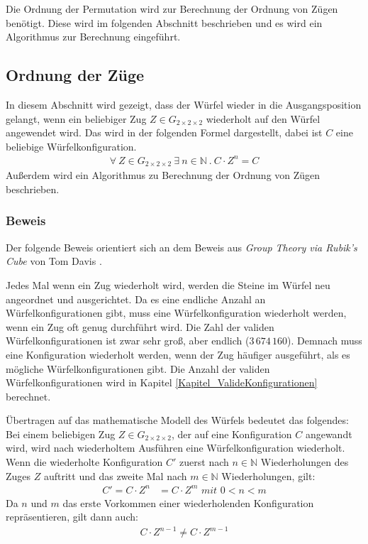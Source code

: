 \documentclass[12pt,a4paper, usenames, dvipsnames]{article}
\theoremstyle{mystyle}
\theoremstyle{definition}
\newcommand{\Gtwo}{\ensuremath{G_{2\times 2\times 2}}}
\begin{document}
Die Ordnung der Permutation wird zur Berechnung der Ordnung von Zügen benötigt. Diese wird im folgenden Abschnitt beschrieben und es wird ein Algorithmus zur Berechnung eingeführt.

%
%
%
%
%
%
%
%
%
%
%
%

\subsection{Ordnung der Züge}
\label{Abschnitt_OrdnungZüge}

In diesem Abschnitt wird gezeigt, dass der Würfel wieder in die Ausgangsposition gelangt, wenn ein beliebiger Zug $Z \in \Gtwo$ wiederholt auf den Würfel angewendet wird. Das wird in der folgenden Formel dargestellt, dabei ist $C$ eine beliebige Würfelkonfiguration.
\begin{align*}
\forall \ Z \in \Gtwo \ \exists \ n \in \mathbb{N} \ . \ C \cdot Z^n = C
\end{align*}
Außerdem wird ein Algorithmus zu Berechnung der Ordnung von Zügen beschrieben.

\subsubsection*{Beweis}

Der folgende Beweis orientiert sich an dem Beweis aus \textit{Group Theory via Rubik's Cube} von Tom Davis \cite{TD}.

Jedes Mal wenn ein Zug wiederholt wird, werden die Steine im Würfel neu angeordnet und ausgerichtet. 
Da es eine endliche Anzahl an Würfelkonfigurationen gibt, muss eine Würfelkonfiguration wiederholt werden, wenn ein Zug oft genug durchführt wird.
Die Zahl der validen Würfelkonfigurationen ist zwar sehr groß, aber endlich ($3 \, 674 \, 160$). Demnach muss eine Konfiguration wiederholt werden, wenn der Zug häufiger ausgeführt, als es mögliche Würfelkonfigurationen gibt. Die Anzahl der validen Würfelkonfigurationen wird in Kapitel \ref{Kapitel_ValideKonfigurationen} berechnet.

Übertragen auf das mathematische Modell des Würfels bedeutet das folgendes: Bei einem beliebigen Zug $Z \in \Gtwo$, der auf eine Konfiguration $C$ angewandt wird, wird nach wiederholtem Ausführen eine Würfelkonfiguration wiederholt. Wenn die wiederholte Konfiguration $C'$ zuerst nach $n \in \mathbb{N}$ Wiederholungen des Zuges $Z$ auftritt und das zweite Mal nach $m \in \mathbb{N}$ Wiederholungen, gilt: 
\begin{align*}
C' = C \cdot Z^n& = C \cdot Z^m \textit{ mit } 0<n<m 
\end{align*}
Da $n$ und $m$ das erste Vorkommen einer wiederholenden Konfiguration repräsentieren, gilt dann auch:
\begin{align*}
C \cdot Z^{n-1} \neq C \cdot Z^{m-1}
\end{align*}
\end{document}
